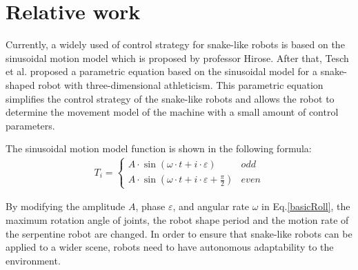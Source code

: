 \section{Relative work}
Currently, a widely used of control strategy for snake-like robots is based on the sinusoidal motion model\cite{HiroseSine} which is proposed by professor Hirose. After that, Tesch et al. proposed a parametric equation based on the sinusoidal model for a snake-shaped robot with three-dimensional athleticism\cite{ChosetSine}. This parametric equation simplifies the control strategy of the snake-like robots and allows the robot to determine the movement model of the machine with a small amount of control parameters.

The sinusoidal motion model function is shown in the following formula:
\begin{eqnarray}\label{basicRoll}
T_i=\left\{
\begin{array}{lr}
A\cdot \sin (\omega \cdot t + i\cdot \varepsilon )&odd\\
A\cdot \sin (\omega \cdot t + i\cdot \varepsilon +  \frac{\pi}{2})&even
\end{array}
\right.
\end{eqnarray}

By modifying the amplitude $A$, phase $\varepsilon$, and angular rate $\omega$ in Eq.\ref{basicRoll}, the maximum rotation angle of joints, the robot shape period and the motion rate of the serpentine robot are changed. In order to ensure that snake-like robots can be applied to a wider scene, robots need to have autonomous adaptability to the environment.

